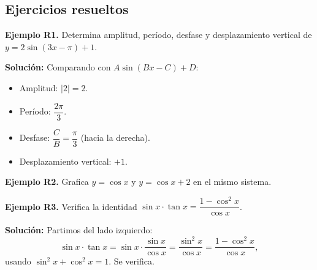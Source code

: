 \documentclass[12pt, letterpaper]{article}
\begin{document}
\subsection{Ejercicios resueltos}

\textbf{Ejemplo R1.} Determina amplitud, período, desfase y desplazamiento vertical de $y = 2\sin(3x - \pi) + 1$.

\begin{cuadrosolucion}
  \textbf{Solución:} Comparando con $A\sin(Bx - C) + D$:
  \begin{itemize}
    \item Amplitud: $|2| = 2$.
    \item Período: $\dfrac{2\pi}{3}$.
    \item Desfase: $\dfrac{C}{B} = \dfrac{\pi}{3}$ (hacia la derecha).
    \item Desplazamiento vertical: $+1$.
  \end{itemize}
\end{cuadrosolucion}

\textbf{Ejemplo R2.} Grafica $y = \cos x$ y $y = \cos x + 2$ en el mismo sistema.

\begin{cuadrosolucion}
  \begin{center}
  \end{center}
\end{cuadrosolucion}

\textbf{Ejemplo R3.} Verifica la identidad $\sin x \cdot \tan x = \dfrac{1 - \cos^2 x}{\cos x}$.

\begin{cuadrosolucion}
  \textbf{Solución:} Partimos del lado izquierdo:
  $$\sin x \cdot \tan x = \sin x \cdot \frac{\sin x}{\cos x} = \frac{\sin^2 x}{\cos x} = \frac{1 - \cos^2 x}{\cos x},$$
  usando $\sin^2 x + \cos^2 x = 1$. Se verifica.
\end{cuadrosolucion}
\end{document}
